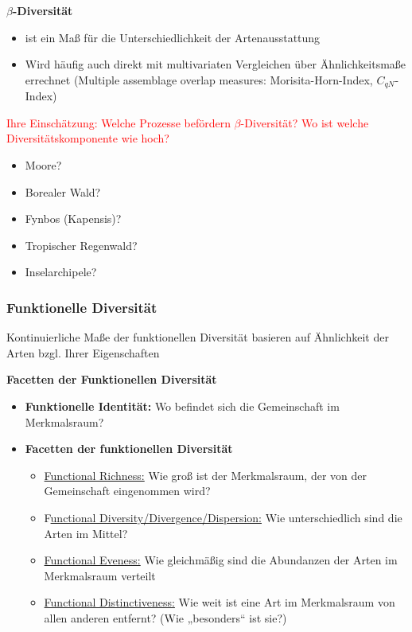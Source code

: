 \newpage
\textbf{$\beta$-Diversität}
\begin{itemize}
	\item ist ein Maß für die Unterschiedlichkeit der Artenausstattung
	\item Wird häufig auch direkt mit multivariaten Vergleichen über Ähnlichkeitsmaße errechnet (Multiple assemblage overlap measures: Morisita-Horn-Index, $C_{qN}$-Index)
\end{itemize}

\textcolor{red}{Ihre Einschätzung: Welche Prozesse befördern $\beta$-Diversität? Wo ist welche Diversitätskomponente wie hoch?}
\begin{itemize}
	\item Moore?
	\item Borealer Wald?
	\item Fynbos (Kapensis)?
	\item Tropischer Regenwald?
	\item Inselarchipele?
\end{itemize}

\newpage
\subsubsection{Funktionelle Diversität}
Kontinuierliche Maße der funktionellen Diversität basieren auf Ähnlichkeit der Arten bzgl. Ihrer Eigenschaften

\textbf{Facetten der Funktionellen Diversität}
\begin{itemize}
	\item \textbf{Funktionelle Identität:} Wo befindet sich die Gemeinschaft im Merkmalsraum?
	\item \textbf{Facetten der funktionellen Diversität}
	\begin{itemize}
		\item \underline{Functional Richness:} Wie groß ist der Merkmalsraum, der von der Gemeinschaft eingenommen wird?
		\item F\underline{unctional Diversity/Divergence/Dispersion:} Wie unterschiedlich sind die Arten im Mittel?
		\item \underline{Functional Eveness:} Wie gleichmäßig sind die Abundanzen der Arten im Merkmalsraum verteilt
		\item \underline{Functional Distinctiveness:} Wie weit ist eine Art im Merkmalsraum von allen anderen entfernt? (Wie „besonders“ ist sie?)
	\end{itemize}
\end{itemize}

